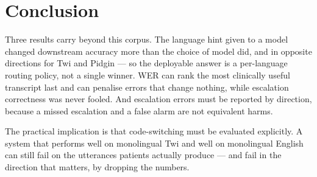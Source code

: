 \documentclass[a4paper,10pt,twocolumn]{article}
\begin{document}
\section{Conclusion}

Three results carry beyond this corpus. The language hint given to a model
changed downstream accuracy more than the choice of model did, and in opposite
directions for Twi and Pidgin --- so the deployable answer is a per-language
routing policy, not a single winner. WER can rank the most clinically useful
transcript last and can penalise errors that change nothing, while escalation
correctness was never fooled. And escalation errors must be reported by
direction, because a missed escalation and a false alarm are not equivalent
harms.

The practical implication is that code-switching must be evaluated explicitly. A
system that performs well on monolingual Twi and well on monolingual English can
still fail on the utterances patients actually produce --- and fail in the
direction that matters, by dropping the numbers.
\end{document}
